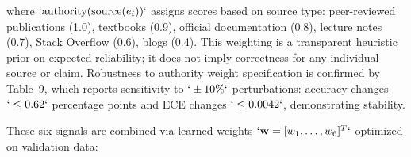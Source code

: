 \begin{Shaded}
\begin{Highlighting}[]
\end{Highlighting}
\end{Shaded}

\begin{Shaded}
\begin{Highlighting}[]
\end{Highlighting}
\end{Shaded}

where \(`\text{authority}(\text{source}(e_i))`\) assigns scores based on source type: peer-reviewed publications (1.0), textbooks (0.9), official documentation (0.8), lecture notes (0.7), Stack Overflow (0.6), blogs (0.4). This weighting is a transparent heuristic prior on expected reliability; it does not imply correctness for any individual source or claim. Robustness to authority weight specification is confirmed by Table~9, which reports sensitivity to \(`\pm10\%`\) perturbations: accuracy changes \(`\leq 0.62`\) percentage points and ECE changes \(`\leq 0.0042`\), demonstrating stability.

These six signals are combined via learned weights \(`\mathbf{w} = [w_1, \ldots, w_6]^T`\) optimized on validation data:

\begin{Shaded}
\begin{Highlighting}[]
\NormalTok{z = \&\textbackslash{}mathbf\{w\}\^{}T [S\_\{\textbackslash{}text\{rel\}\}, S\_\{\textbackslash{}text\{ent\}\}, S\_\{\textbackslash{}text\{div\}\}, S\_\{\textbackslash{}text\{agree\}\}, \textbackslash{}nonumber \textbackslash{}\textbackslash{}}
\NormalTok{     \&S\_\{\textbackslash{}text\{margin\}\}, S\_\{\textbackslash{}text\{auth\}\}]\^{}T + b}
\end{Highlighting}
\end{Shaded}

